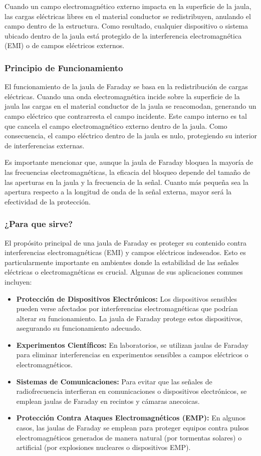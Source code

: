 \documentclass{article}
\begin{document}
Cuando un campo electromagnético externo impacta en la superficie de la jaula, las cargas eléctricas libres en el material conductor se redistribuyen, anulando el campo dentro de la estructura. Como resultado, cualquier dispositivo o sistema ubicado dentro de la jaula está protegido de la interferencia electromagnética (EMI) o de campos eléctricos externos.

\subsubsection{Principio de Funcionamiento}
El funcionamiento de la jaula de Faraday se basa en la redistribución de cargas eléctricas. Cuando una onda electromagnética incide sobre la superficie de la jaula las cargas en el material conductor de la jaula se reacomodan, generando un campo eléctrico que contrarresta el campo incidente. Este campo interno es tal que cancela el campo electromagnético externo dentro de la jaula. Como consecuencia, el campo eléctrico dentro de la jaula es nulo, protegiendo su interior de interferencias externas.

Es importante mencionar que, aunque la jaula de Faraday bloquea la mayoría de las frecuencias electromagnéticas, la eficacia del bloqueo depende del tamaño de las aperturas en la jaula y la frecuencia de la señal. Cuanto más pequeña sea la apertura respecto a la longitud de onda de la señal externa, mayor será la efectividad de la protección.

\subsubsection{¿Para que sirve?}
El propósito principal de una jaula de Faraday es proteger su contenido contra interferencias electromagnéticas (EMI) y campos eléctricos indeseados. Esto es particularmente importante en ambientes donde la estabilidad de las señales eléctricas o electromagnéticas es crucial. Algunas de sus aplicaciones comunes incluyen:
\begin{itemize}
    \item \textbf{Protección de Dispositivos Electrónicos:} Los dispositivos sensibles pueden verse afectados por interferencias electromagnéticas que podrían alterar su funcionamiento. La jaula de Faraday protege estos dispositivos, asegurando su funcionamiento adecuado.
    \item \textbf{Experimentos Científicos:} En laboratorios, se utilizan jaulas de Faraday para eliminar interferencias en experimentos sensibles a campos eléctricos o electromagnéticos.
    \item \textbf{Sistemas de Comunicaciones:} Para evitar que las señales de radiofrecuencia interfieran en comunicaciones o dispositivos electrónicos, se emplean jaulas de Faraday en recintos y cámaras anecoicas.
    \item \textbf{Protección Contra Ataques Electromagnéticos (EMP):} En algunos casos, las jaulas de Faraday se emplean para proteger equipos contra pulsos electromagnéticos generados de manera natural (por tormentas solares) o artificial (por explosiones nucleares o dispositivos EMP).
\end{itemize}
\end{document}
